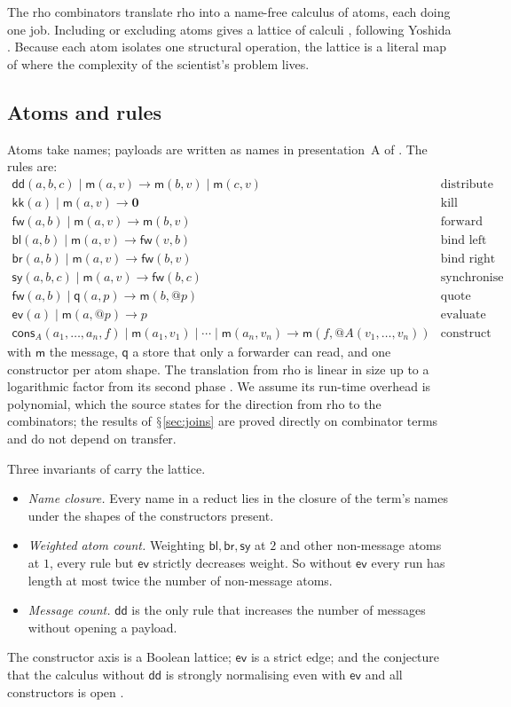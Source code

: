 \documentclass[11pt]{article}
\makeatletter
\theoremstyle{definition}
\theoremstyle{plain}
\theoremstyle{remark}
\newcommand{\quo}[1]{@#1}
\newcommand{\nil}{\mathbf{0}}
\DeclareRobustCommand{\S}{\ifmmode\mathsection\else$\mathsection$\fi}
\newcommand{\cm}{\mathsf{m}}
\newcommand{\cfw}{\mathsf{fw}}
\newcommand{\cdd}{\mathsf{dd}}
\newcommand{\ckk}{\mathsf{kk}}
\newcommand{\csy}{\mathsf{sy}}
\newcommand{\cbl}{\mathsf{bl}}
\newcommand{\cbr}{\mathsf{br}}
\newcommand{\cev}{\mathsf{ev}}
\newcommand{\cq}{\mathsf{q}}
\newcommand{\ccons}{\mathsf{cons}}
\makeatother
\begin{document}
The rho combinators \cite{RhoComb} translate rho into a name-free
calculus of atoms, each doing one job. Including or excluding atoms gives
a lattice of calculi \cite[\S9]{RhoComb}, following Yoshida
\cite{Yoshida02}. Because each atom isolates one structural operation,
the lattice is a literal map of where the complexity of the scientist's
problem lives.

\subsection{Atoms and rules}

Atoms take names; payloads are written as names in presentation~A of
\cite{RhoComb}. The rules are:
\[
\begin{array}{ll}
\cdd(a,b,c) \mid \cm(a,v) \to \cm(b,v) \mid \cm(c,v) & \text{distribute}\\
\ckk(a) \mid \cm(a,v) \to \nil & \text{kill}\\
\cfw(a,b) \mid \cm(a,v) \to \cm(b,v) & \text{forward}\\
\cbl(a,b) \mid \cm(a,v) \to \cfw(v,b) & \text{bind left}\\
\cbr(a,b) \mid \cm(a,v) \to \cfw(b,v) & \text{bind right}\\
\csy(a,b,c) \mid \cm(a,v) \to \cfw(b,c) & \text{synchronise}\\
\cfw(a,b) \mid \cq(a,p) \to \cm(b,\quo{p}) & \text{quote}\\
\cev(a) \mid \cm(a,\quo{p}) \to p & \text{evaluate}\\
\ccons_A(a_1,\dots,a_n,f) \mid \cm(a_1,v_1) \mid \cdots \mid \cm(a_n,v_n)
  \to \cm(f,\quo{A(v_1,\dots,v_n)}) & \text{construct}
\end{array}
\]
with $\cm$ the message, $\cq$ a store that only a forwarder can read, and
one constructor per atom shape. The translation from rho is linear in
size up to a logarithmic factor from its second phase
\cite[Prop.~linear]{RhoComb}. We assume its run-time overhead is
polynomial, which the source states for the direction from rho to the
combinators; the results of \S\ref{sec:joins} are proved directly on
combinator terms and do not depend on transfer.

Three invariants of \cite{RhoComb} carry the lattice.
\begin{itemize}
\item \emph{Name closure.} Every name in a reduct lies in the closure of
the term's names under the shapes of the constructors present.
\item \emph{Weighted atom count.} Weighting $\cbl, \cbr, \csy$ at $2$ and
other non-message atoms at $1$, every rule but $\cev$ strictly decreases
weight. So without $\cev$ every run has length at most twice the number
of non-message atoms.
\item \emph{Message count.} $\cdd$ is the only rule that increases the
number of messages without opening a payload.
\end{itemize}
The constructor axis is a Boolean lattice; $\cev$ is a strict edge; and
the conjecture that the calculus without $\cdd$ is strongly normalising
even with $\cev$ and all constructors is open \cite[Conj.~dup]{RhoComb}.
\end{document}
